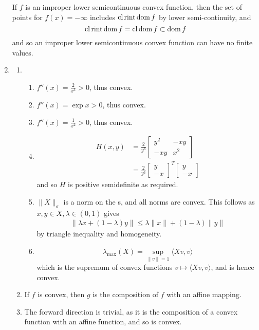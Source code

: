 \begin{enumerate}[label*=Ex \arabic*.]
  If $f$ is an improper lower semicontinuous convex function, then the
  set of points for $f(x) = -\infty$ includes $\operatorname*{cl} \operatorname*{rint} \operatorname*{dom} f$ by
  lower semi-continuity, and
  \begin{equation}
    \label{eq:17}
    \operatorname*{cl} \operatorname*{rint} \operatorname*{dom} f = \operatorname*{cl} \operatorname*{dom} f \subset \operatorname*{dom} f
  \end{equation} and so an improper lower semicontinuous convex
  function can have no finite values.

\item \label{item:5}
  \begin{enumerate}
  \item
    \begin{enumerate}
    \item $f''(x) = \frac{2}{x^{3}} > 0$, thus convex.
    \item $f''(x) = \exp x > 0$, thus convex.
    \item $f''(x) = \frac{1}{x^{2}} > 0$, thus convex.
    \item
      \begin{align}
        \label{eq:13}
        H(x, y) &= \frac{2}{y^{3}}
        \begin{bmatrix}
          y^{2} & -xy \\
          -xy & x^{2}
        \end{bmatrix} \\
        &= \frac{2}{y^{3}}
        \begin{bmatrix}
          y \\
          -x
        \end{bmatrix}^{T}
        \begin{bmatrix}
          y \\
          -x
        \end{bmatrix}
      \end{align}
      and so $H$ is positive semidefinite as required.

    \item $\| X \|_{\sigma}$ is a norm on the s, and all norms are
      convex. This follows as $x, y \in X, \lambda \in (0, 1)$ gives
      \begin{align}
        \label{eq:11}
        \| \lambda x + (1-\lambda) y \| \leq \lambda \| x \| +
        (1-\lambda) \| y \|
      \end{align} by triangle inequality and homogeneity.

    \item
      \begin{equation}
        \label{eq:15}
        \lambda_{\max}(X) = \sup_{\| v \| = 1} \langle Xv, v \rangle
      \end{equation} which is the supremum of convex functions $v
      \mapsto \langle Xv, v \rangle$, and is hence convex.
    \end{enumerate}
    \item If $f$ is convex, then $g$ is the composition of $f$ with an
      affine mapping.
    \item The forward direction is trivial, as it is the composition
      of a convex function with an affine function, and so is convex.


\end{enumerate}
\end{enumerate}
